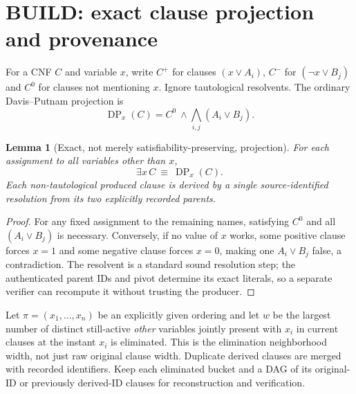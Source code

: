 \documentclass[11pt]{article}
\newtheorem{lemma}[theorem]{Lemma}
\begin{document}
\section{BUILD: exact clause projection and provenance}
For a CNF $C$ and variable $x$, write $C^+$ for clauses $(x\lor A_i)$, $C^-$ for $(\neg x\lor B_j)$ and $C^0$ for clauses not mentioning $x$. Ignore tautological resolvents. The ordinary Davis--Putnam projection is
\[
 \operatorname{DP}_x(C)=C^0\ \wedge\!\bigwedge_{i,j}(A_i\lor B_j).
\]
\begin{lemma}[Exact, not merely satisfiability-preserving, projection]\label{lem:dp}
For each assignment to all variables other than $x$,
\[\exists x\,C\ \equiv\ \operatorname{DP}_x(C).\]
Each non-tautological produced clause is derived by a \emph{single} source-identified resolution from its two explicitly recorded parents.
\end{lemma}
\begin{proof}
For any fixed assignment to the remaining names, satisfying $C^0$ and all $(A_i\lor B_j)$ is necessary. Conversely, if no value of $x$ works, some positive clause forces $x=1$ and some negative clause forces $x=0$, making one $A_i\lor B_j$ false, a contradiction. The resolvent is a standard sound resolution step; the authenticated parent IDs and pivot determine its exact literals, so a separate verifier can recompute it without trusting the producer.
\end{proof}

Let $\pi=(x_1,\ldots,x_n)$ be an explicitly given ordering and let $w$ be the largest number of distinct still-active \emph{other} variables jointly present with $x_i$ in current clauses at the instant $x_i$ is eliminated. This is the elimination neighborhood width, not just raw original clause width. Duplicate derived clauses are merged with recorded identifiers. Keep each eliminated bucket and a DAG of its original-ID or previously derived-ID clauses for reconstruction and verification.
\end{document}
